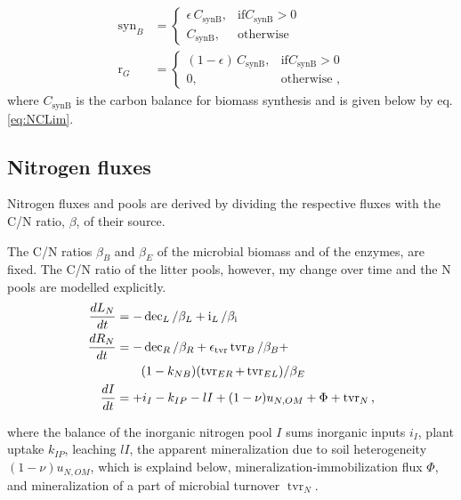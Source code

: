 \begin{subequations}
\label{eq:synB}
\begin{align}
\operatorname{syn}_B &= \begin{cases}
  \epsilon \, C_{\operatorname{synB}},  & \text{if} C_{\operatorname{synB}} >
  0\\
  C_{\operatorname{synB}}, & \text{otherwise}
\end{cases} \\  
\operatorname{r}_G &= \begin{cases}
  (1 - \epsilon) \, C_{\operatorname{synB}},  & \text{if}
  C_{\operatorname{synB}} > 0\\
  0, & \text{otherwise ,}
\end{cases}  
\end{align}
\end{subequations}
where $C_{\operatorname{synB}}$ is the carbon balance for biomass
synthesis and is given below by eq.
\ref{eq:NCLim}.



\subsection{Nitrogen fluxes}
Nitrogen fluxes and pools are derived by dividing the respective fluxes with the
C/N ratio, $\beta$, of their source.

The C/N ratios $\beta_B$ and $\beta_E$ of the microbial biomass and of the
enzymes, are fixed. The C/N ratio of the litter pools, however, my change over time and
the N pools are modelled explicitly.
\begin{subequations}
\label{eq:SEAMN}
\begin{align}
\frac{dL_N}{dt} &=  - \operatorname{dec}_L /\beta_{L} +
\operatorname{i}_L/\beta_{\operatorname{i}} 
\\
\frac{dR_N}{dt} &=  - \operatorname{dec}_R /\beta_{R} +
\epsilon_{\operatorname{tvr}} \operatorname{tvr}_B /\beta_{B} + \notag 
\\
& \qquad (1 -k_{NB}) (\operatorname{tvr}_{ER} +
\operatorname{tvr}_{EL})/\beta_{E} 
\\
\frac{dI}{dt} &= +i_I -k_{IP} -l I +(1-\nu) u_{N,OM} +\Phi +
\operatorname{tvr}_N
\text{,} 
\end{align}
\end{subequations}

\noindent where the balance of the inorganic nitrogen pool $I$ sums inorganic
inputs $i_I$, plant uptake $k_{IP}$, leaching $l I$, the apparent mineralization
due to soil heterogeneity $(1 -\nu) u_{N,OM}$, which is explaind below,
mineralization-immobilization flux $\Phi$, and mineralization of a part of
microbial turnover $\operatorname{tvr}_N$.

